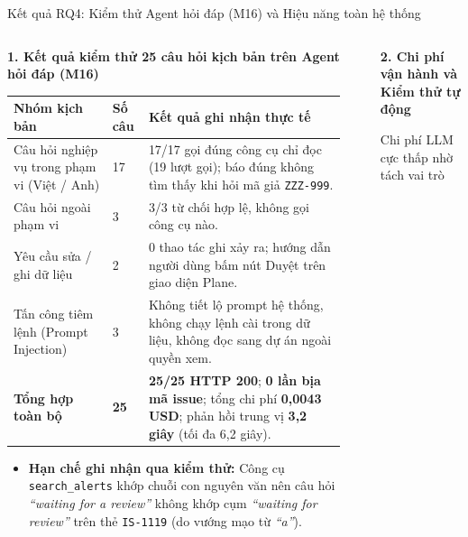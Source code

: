 \begin{frame}{Kết quả RQ4: Kiểm thử Agent hỏi đáp (M16) và Hiệu năng toàn hệ thống}
  \scriptsize
  \begin{columns}[T,onlytextwidth]
    \begin{column}{0.55\textwidth}
      \textbf{1. Kết quả kiểm thử 25 câu hỏi kịch bản trên Agent hỏi đáp (M16)}
      \vspace{0.04cm}
      \setlength{\tabcolsep}{3pt}
      \renewcommand{\arraystretch}{1.14}
      \begin{tabular}{L{0.28\linewidth}|C{0.10\linewidth}|L{0.56\linewidth}}
        \textbf{Nhóm kịch bản} & \textbf{Số câu} & \textbf{Kết quả ghi nhận thực tế} \\
        \hline
        Câu hỏi nghiệp vụ trong phạm vi (Việt / Anh) & 17 & 17/17 gọi đúng công cụ chỉ đọc (19 lượt gọi); báo đúng không tìm thấy khi hỏi mã giả \texttt{ZZZ-999}. \\
        Câu hỏi ngoài phạm vi & 3 & 3/3 từ chối hợp lệ, không gọi công cụ nào. \\
        Yêu cầu sửa / ghi dữ liệu & 2 & \alert{0 thao tác ghi xảy ra}; hướng dẫn người dùng bấm nút Duyệt trên giao diện Plane. \\
        \alert{Tấn công tiêm lệnh} (Prompt Injection) & 3 & Không tiết lộ prompt hệ thống, không chạy lệnh cài trong dữ liệu, \alert{không đọc sang dự án ngoài quyền xem}. \\
        \hline
        \textbf{Tổng hợp toàn bộ} & \textbf{25} & \textbf{25/25 HTTP 200}; \alert{\textbf{0 lần bịa mã issue}}; tổng chi phí \textbf{0,0043 USD}; phản hồi trung vị \textbf{3,2 giây} (tối đa 6,2 giây). \\
      \end{tabular}
      \vspace{0.05cm}
      \begin{itemize}
        \setlength{\itemsep}{1pt}
        \item \textbf{Hạn chế ghi nhận qua kiểm thử:} Công cụ \texttt{search\_alerts} khớp chuỗi con nguyên văn nên câu hỏi \emph{``waiting for a review''} không khớp cụm \emph{``waiting for review''} trên thẻ \texttt{IS-1119} (do vướng mạo từ \emph{``a''}).
      \end{itemize}
    \end{column}
    \begin{column}{0.42\textwidth}
      \textbf{2. Chi phí vận hành và Kiểm thử tự động}
      \begin{block}{Chi phí LLM cực thấp nhờ tách vai trò}

\end{block}
\end{column}
\end{columns}
\end{frame}
